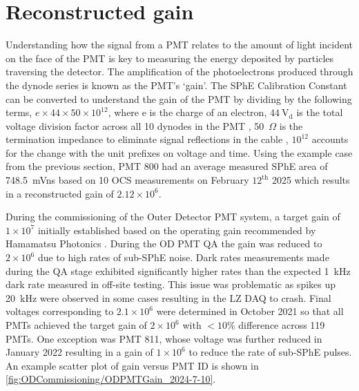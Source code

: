 \section{Reconstructed gain}\label{sec:ODComissioning/RecGain}
Understanding how the signal from a PMT relates to the amount of light incident on the face of the PMT is key to measuring the energy deposited by particles traversing the detector. The amplification of the photoelectrons produced through the dynode series is known as the PMT's `gain'. The SPhE Calibration Constant can be converted to understand the gain of the PMT by dividing by the following terms, $e\times44\times50\times10^{12}$, where e is the charge of an electron, $44~\text{V}_{\text{d}}$ is the total voltage division factor across all 10 dynodes in the PMT \cite{HamamatsuR5912}, 50~$\Omega$ is the termination impedance to eliminate signal reflections in the cable \cite{LZ:2024bvw}, $10^{12}$ accounts for the change with the unit prefixes on voltage and time. Using the example case from the previous section, PMT 800 had an average measured SPhE area of 748.5~mVns based on 10 OCS measurements on February $12^{\text{th}}$ 2025 which results in a reconstructed gain of $2.12\times10^6$.

During the commissioning of the Outer Detector PMT system, a target gain of $1\times10^{7}$ initially established based on the operating gain recommended by Hamamatsu Photonics \cite{LZTDR,HamamatsuR5912}. During the OD PMT QA the gain was reduced to $2\times10^{6}$ due to high rates of sub-SPhE noise. Dark rates measurements made during the QA stage exhibited significantly higher rates than the expected 1~kHz dark rate measured in off-site testing. This issue was problematic as spikes up 20~kHz were observed in some cases resulting in the LZ DAQ to crash. Final voltages corresponding to $2.1\times10^{6}$ were determined in October 2021 so that all PMTs achieved the target gain of $2\times10^6$ with $<10\%$ difference across 119 PMTs. One exception was PMT 811, whose voltage was further reduced in January 2022 resulting in a gain of $1\times10^6$ to reduce the rate of sub-SPhE pulses.
An example scatter plot of gain versus PMT ID is shown in \autoref{fig:ODCommissioning/ODPMTGain_2024-7-10}.


